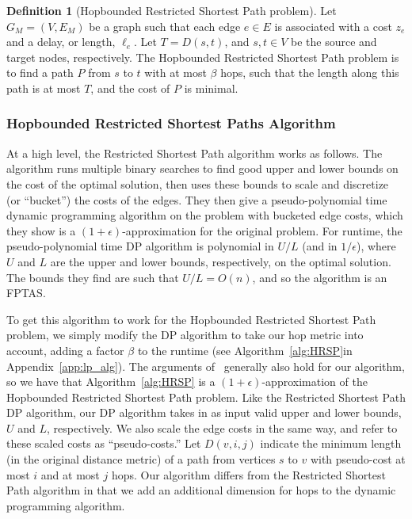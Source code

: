 \documentclass{article}
\theoremstyle{definition}
\newtheorem{definition}{Definition}
\theoremstyle{remark}
\newcommand{\quotes}[1]{``#1''}
\begin{document}
\begin{definition}[Hopbounded Restricted Shortest Path problem]
    Let $G_M = (V,E_M)$ be a graph such that each edge $e \in E$ is associated with a cost $z_e$ and a delay, or length, $\ell_e$. Let $T = D(s,t)$, and $s,t \in V$ be the source and target nodes, respectively. The Hopbounded Restricted Shortest Path problem is to find a path $P$ from $s$ to $t$ with at most $\beta$ hops, such that the length along this path is at most $T$, and the cost of $P$ is minimal.
\end{definition}

\subsubsection{Hopbounded Restricted Shortest Paths Algorithm}
At a high level, the Restricted Shortest Path algorithm works as follows. The algorithm runs multiple binary searches to find good upper and lower bounds on the cost of the optimal solution, then uses these bounds to scale and discretize (or ``bucket'') the costs of the edges. They then give a pseudo-polynomial time dynamic programming algorithm on the problem with bucketed edge costs, which they show is a $(1+\epsilon)$-approximation for the original problem. For runtime, the pseudo-polynomial time DP algorithm is polynomial in $U/L$ (and in $1/\epsilon$), where $U$ and $L$ are the upper and lower bounds, respectively, on the optimal solution. The bounds they find are such that $U/L = O(n)$, and so the algorithm is an FPTAS. 

To get this algorithm to work for the Hopbounded Restricted Shortest Path problem, we simply modify the DP algorithm to take our hop metric into account, adding a factor $\beta$ to the runtime (see Algorithm~\ref{alg:HRSP}\iflong\else in Appendix~\ref{app:lp_alg}\fi). \iflong \else The arguments of~\cite{LR01} generally also hold for our algorithm, so we have that Algorithm~\ref{alg:HRSP} is a $(1+\epsilon)$-approximation of the Hopbounded Restricted Shortest Path problem. \fi
\iflong
Like the Restricted Shortest Path DP algorithm, our DP algorithm takes in as input valid upper and lower bounds, $U$ and $L$, respectively. We also scale the edge costs in the same way, and refer to these scaled costs as \quotes{pseudo-costs.} Let $D(v, i, j)$ indicate the minimum length (in the original distance metric) of a path from vertices $s$ to $v$ with pseudo-cost at most $i$ and at most $j$ hops. Our algorithm differs from the Restricted Shortest Path algorithm in that we add an additional dimension for hops to the dynamic programming algorithm.
\end{document}
